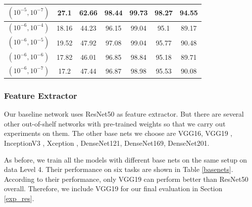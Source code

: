 \documentclass[a4paper,12pt]{article}
\begin{document}
\begin{table}[H]
{\begin{tabular}{|c|c|c|c|c|c|c|}
			$(10^{-5}, 10^{-7})$ & 27.1 & 62.66 & 98.44 & \textbf{99.73} & 98.27 & 94.55 \\ \hline
			$(10^{-6}, 10^{-4})$ & 18.16 & 44.23 & 96.15 & 99.04 & 95.1 & 89.17 \\ \hline
			$(10^{-6}, 10^{-5})$ & 19.52 & 47.92 & 97.08 & 99.04 & 95.77 & 90.48 \\ \hline
			$(10^{-6}, 10^{-6})$ & 17.82 & 46.01 & 96.85 & 98.84 & 95.18 & 89.71 \\ \hline
			$(10^{-6}, 10^{-7})$ & 17.2 & 47.44 & 96.87 & 98.98 & 95.53 & 90.08 \\ \hline
		\end{tabular}%
	}
\end{table}

\subsubsection{Feature Extractor}
Our baseline network uses ResNet50 as feature extractor. But there are several other out-of-shelf networks with pre-trained weights so that we carry out experiments on them. The other base nets we choose are VGG16, VGG19 \cite{DBLP:SimonyanZ14a}, InceptionV3 \cite{DBLP:journals/corr/SzegedyVISW15}, Xception \cite{DBLP:journals/corr/Chollet16a}, DenseNet121, DenseNet169, DenseNet201\cite{DBLP:journals/corr/HuangLW16a}.

As before, we train all the models with different base nets on the same setup on data Level 4. Their performance on six tasks are shown in Table \ref{basenets}. According to their performance, only VGG19 can perform better than ResNet50 overall. Therefore, we include VGG19 for our final evaluation in Section \ref{exp_res}.
\end{document}
